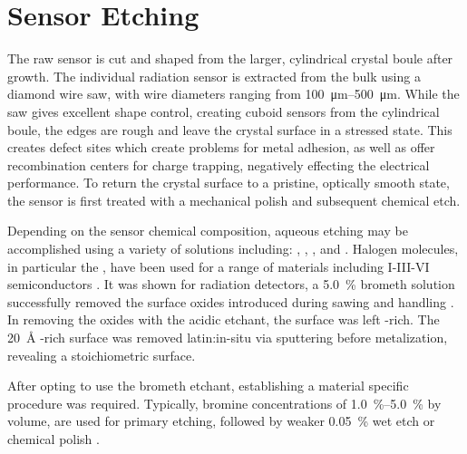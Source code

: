 \documentclass[../../main.tex]{subfiles}%
\begin{document}
%
    \section{Sensor Etching}%
    \label{app:general-chemistry:sensor-etching}%
    The raw sensor is cut and shaped from the larger, cylindrical crystal boule after growth.
    The individual radiation sensor is extracted from the bulk using a diamond wire saw, with wire diameters ranging from \SIrange{100}{500}{\micro\meter}.
    While the saw gives excellent shape control, creating cuboid sensors from the cylindrical boule, the edges are rough and leave the crystal surface in a stressed state.
    This creates defect sites which create problems for metal adhesion, as well as offer recombination centers for charge trapping, negatively effecting the electrical performance.
    To return the crystal surface to a pristine, optically smooth state, the sensor is first treated with a mechanical polish and subsequent chemical etch.
    \par%
    Depending on the sensor chemical composition, aqueous etching may be accomplished using a variety of solutions including: , , , and . 
    Halogen molecules, in particular the , have been used for a range of materials including I-III-VI semiconductors \cite{Causier_2011,Shen_2016}.
    It was shown for  radiation detectors, a \SI{5.0}{\percent} \gls{brometh} solution successfully removed the surface oxides introduced during sawing and handling \cite{Rouse_2002}.
    In removing the oxides with the acidic etchant, the surface was left -rich.
    The \SI{20}{\angstrom} -rich surface was removed \gls{latin:in-situ} via  sputtering before metalization, revealing a stoichiometric surface.
    \par%
    After opting to use the \gls{brometh} etchant, establishing a material specific procedure was required.
    Typically, bromine concentrations of \SIrange{1.0}{5.0}{\percent} by volume, are used for primary etching, followed by weaker \SI{0.05}{\percent} wet etch or chemical polish \cite{Aspnes_1981}.
\end{document}
